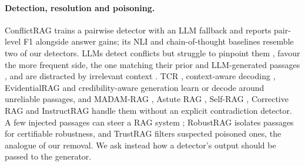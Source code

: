 \paragraph{Detection, resolution and poisoning.}
ConflictRAG \citep{wang2026conflictrag} trains a pairwise detector with an LLM fallback and reports pair-level F1
alongside answer gains; its NLI and chain-of-thought baselines resemble two of our detectors. LLMs detect conflicts but struggle to pinpoint them
\citep{gokul2025contradiction,wang2024resolving,jiayang2024econ}, favour the more frequent side, the one matching
their prior and LLM-generated passages \citep{jin2024tugofwar,kortukov2024realistic,tan2024blinded}, and are
distracted by irrelevant context \citep{shi2023distracted,schuster2026whose}. TCR \citep{ye2026tcr}, context-aware
decoding \citep{shi2024cad}, EvidentialRAG \citep{hossain2026evidentialrag} and credibility-aware generation
\citep{pan2024credibility} learn or decode around unreliable passages, and MADAM-RAG \citep{wang2025madam}, Astute RAG
\citep{wang2025astute}, Self-RAG \citep{asai2024selfrag}, Corrective RAG \citep{yan2024crag} and InstructRAG
\citep{wei2025instructrag} handle them without an explicit contradiction detector. A few injected passages can steer a RAG
system \citep{zou2025poisonedrag}; RobustRAG \citep{xiang2024robustrag} isolates passages for certifiable robustness,
and TrustRAG \citep{zhou2025trustrag} filters suspected poisoned ones, the analogue of our removal. We ask instead how
a detector's output should be passed to the generator.
